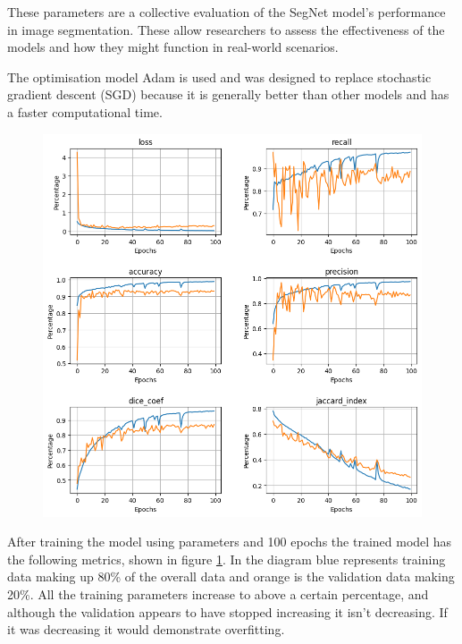 These parameters are a collective evaluation of the SegNet model's performance in image segmentation. These allow researchers to assess the effectiveness of the models and how they might function in real-world scenarios.

The optimisation model Adam is used and was designed to replace stochastic gradient descent (SGD) because it is generally better than other models and has a faster computational time. 

\begin{figure}[]
    \centering
    \includegraphics[scale=0.7]{images/segmentation/SegNet-results.png}
    \caption{}\label{SegNet-results}
\end{figure}

After training the model using parameters and 100 epochs the trained model has the following metrics, shown in figure \ref{SegNet-results}. In the diagram blue represents training data making up 80\% of the overall data and orange is the validation data making 20\%. All the training parameters increase to above a certain percentage, and although the validation appears to have stopped increasing it isn't decreasing. If it was decreasing it would demonstrate overfitting.

